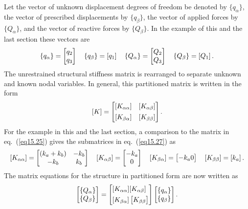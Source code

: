 \documentclass{AeroStructure-ERJohnson}
\begin{document}
Let the vector of unknown displacement degrees of freedom be denoted by $\{q_{\alpha}\}$, the vector of prescribed displacements by $\{q_{\beta}\}$, the vector of applied forces by $\{Q_{\alpha}\}$, and the vector of reactive forces by $\{Q_{\beta}\}$. In the example of this and the last section these vectors are
\begin{align}\label{eq15.26}
\{q_{\alpha}\}=\left[\begin{array}{@{}l@{}}q_{2} \\q_{3}\end{array}\right] \quad\{q_{\beta}\}=\left[q_{1}\right] \quad\{Q_{\alpha}\}=\left[\begin{array}{@{}l@{}}Q_{2} \\Q_{3}\end{array}\right] \quad\{Q_{\beta}\}=\left[Q_{1}\right].
\end{align}
The unrestrained structural stiffness matrix is rearranged to separate unknown and known nodal variables. In general, this partitioned matrix is written in the form
\begin{align}\label{eq15.27}
[K]= \left[\begin{array}{@{}cc@{}}{[K_{\alpha \alpha}]} & {[K_{\alpha \beta}]} \\[4pt]
{[K_{\beta \alpha}]} & {\left[K_{\beta \beta}\right]}\end{array}\right].
\end{align}
For the example in this and the last section, a comparison to the matrix in eq.~(\ref{eq15.25}) gives the submatrices in eq.~(\ref{eq15.27}) as
\begin{align}\label{eq15.28}
[K_{\alpha \alpha}]=\left[\begin{array}{@{}cc@{}}(k_{a}+k_{b}) & -k_{b} \\-k_{b} & k_{b}\end{array}\right] \quad[K_{\alpha \beta}]=\left[\begin{array}{@{}c@{}}-k_{a} \\0\end{array}\right] \quad[K_{\beta \alpha}]=\left[\begin{array}{@{}c@{}}-k_{a} 0\end{array}\right] \quad\left[K_{\beta \beta}\right]=\left[k_{a}\right].
\end{align}
The matrix equations for the structure in partitioned form are now written as
\begin{align}\label{eq15.29}
\left[\begin{array}{@{}l@{}}\{Q_{\alpha}\} \\\{Q_{\beta}\}\end{array}\right]=\left[\begin{array}{@{}l@{}}{[K_{\alpha \alpha}][K_{\alpha \beta}]} \\[4pt] {[K_{\beta \alpha}]\left[\begin{array}{@{}l@{}}K_{\beta \beta}\end{array}\right]}\end{array}\right]\left[\begin{array}{@{}l@{}}\{q_{\alpha}\} \\\{q_{\beta}\}\end{array}\right].
\end{align}
\end{document}
